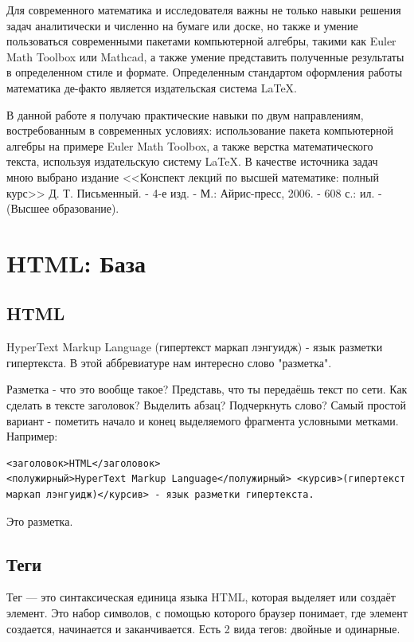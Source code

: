 \documentclass[14pt]{extreport}
\begin{document}



\tableofcontents

\intro

Для современного математика и исследователя важны не только навыки решения задач аналитически и численно на бумаге или доске, но также и умение пользоваться современными пакетами компьютерной алгебры, такими как Euler Math Toolbox или Mathcad, а также умение представить полученные результаты  в определенном стиле и формате. Определенным стандартом оформления работы математика де-факто является издательская система LaTeX.     

В данной работе я получаю практические навыки по двум направлениям, востребованным в современных условиях: использование пакета компьютерной алгебры на примере Euler Math Toolbox, а также верстка математического текста, используя издательскую систему LaTeX. В качестве источника задач мною выбрано издание <<Конспект лекций по высшей математике: полный курс>>  Д. Т. Письменный. - 4-е изд. - М.: Айрис-пресс, 2006. - 608 с.: ил. - (Высшее образование).





\chapter{HTML: База}

\section{HTML}

HyperText Markup Language (гипертекст маркап лэнгуидж) - язык разметки гипертекста. В этой аббревиатуре нам интересно слово "разметка".

Разметка - что это вообще такое? Представь, что ты передаёшь текст по сети. Как сделать в тексте заголовок? Выделить абзац? Подчеркнуть слово? Самый простой вариант - пометить начало и конец выделяемого фрагмента условными метками. Например:
\begin{verbatim}
<заголовок>HTML</заголовок>
<полужирный>HyperText Markup Language</полужирный> <курсив>(гипертекст маркап лэнгуидж)</курсив> - язык разметки гипертекста.
\end{verbatim}
Это разметка.




\section{Теги}
Тег — это синтаксическая единица языка HTML, которая выделяет или создаёт элемент. Это набор символов, с помощью которого браузер понимает, где элемент создается, начинается и заканчивается. Есть 2 вида тегов: двойные и одинарные.
\end{document}
